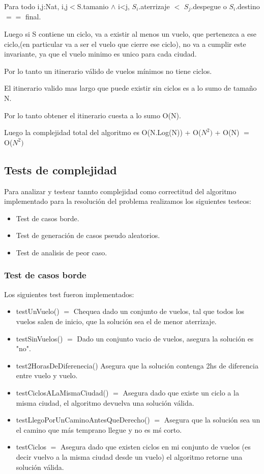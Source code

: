 Para todo i,j:Nat, i,j$<$S.tamanio $\wedge$ i<j, $S_{i}$.aterrizaje $<$ $S_{j}$.despegue o $S_{i}$.destino $==$ final.

Luego si S contiene un ciclo, va a existir al menos un vuelo, que pertenezca a ese ciclo,(en particular va a ser el vuelo que cierre ese ciclo), no va a cumplir este invariante, ya que el vuelo minimo es unico para cada ciudad.

Por lo tanto un itinerario v\'alido de vuelos m\'inimos no tiene ciclos. 

El itinerario valido mas largo que puede existir sin ciclos es a lo sumo de tamaño N.

Por lo tanto obtener el itinerario cuesta a lo sumo O(N).


Luego la complejidad total del algoritmo es O(N.Log(N)) + O($N^{2})$ + O(N) $=$ O($N^{2})$
\subsection{Tests de complejidad}

Para analizar y testear tannto complejidad como correctitud del algoritmo implementado para la resoluci\'on del problema  realizamos los siguientes testeos:

\begin{itemize}
  \item Test de casos borde.
  \item Test de generaci\'on de casos pseudo aleatorios.
  \item Test de analisis de peor caso.
\end{itemize}

\newpage

\subsubsection{Test de casos borde}


Los siguientes test fueron implementados:

\begin{itemize}
  \item testUnVuelo() $=$ Chequea dado un conjunto de vuelos, tal que todos los vuelos salen de inicio, que la soluci\'on sea el de menor aterrizaje.
  \item 	testSinVuelos() $=$ Dado un conjunto vacio de vuelos, asegura la soluci\'on es "no".
  \item test2HorasDeDiferenecia() Asegura que la soluci\'on contenga 2hs de diferencia entre vuelo y vuelo.
  \item testCiclosALaMismaCiudad() $=$ Asegura dado que existe un ciclo a la misma ciudad, el algoritmo devuelva una soluci\'on v\'alida.
  \item testLlegoPorUnCaminoAntesQueDerecho() $=$ Asegura que la soluci\'on sea un el camino que m\'as temprano llegue y no es m\'s corto.
  \item testCiclos $=$ Asegura dado que existen ciclos en mi conjunto de vuelos (es decir vuelvo a la misma ciudad desde un vuelo) el algoritmo retorne una soluci\'on v\'alida.
\end{itemize}

